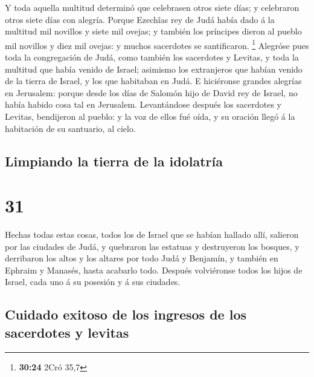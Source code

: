  Y toda aquella multitud determinó que celebrasen otros
siete días; y celebraron otros siete días con alegría. 
Porque Ezechîas rey de Judá había dado á la multitud mil novillos y
siete mil ovejas; y también los príncipes dieron al pueblo mil novillos
y diez mil ovejas: y muchos sacerdotes se santificaron. \footnote{\textbf{30:24}
  2Cró 35,7}  Alegróse pues toda la congregación de Judá,
como también los sacerdotes y Levitas, y toda la multitud que había
venido de Israel; asimismo los extranjeros que habían venido de la
tierra de Israel, y los que habitaban en Judá.  E
hiciéronse grandes alegrías en Jerusalem: porque desde los días de
Salomón hijo de David rey de Israel, no había habido cosa tal en
Jerusalem.  Levantándose después los sacerdotes y
Levitas, bendijeron al pueblo: y la voz de ellos fué oída, y su oración
llegó á la habitación de su santuario, al cielo.

\hypertarget{limpiando-la-tierra-de-la-idolatruxeda}{%
\subsection{Limpiando la tierra de la
idolatría}\label{limpiando-la-tierra-de-la-idolatruxeda}}

\hypertarget{section-30}{%
\section{31}\label{section-30}}

 Hechas todas estas cosas, todos los de Israel que se
habían hallado allí, salieron por las ciudades de Judá, y quebraron las
estatuas y destruyeron los bosques, y derribaron los altos y los altares
por todo Judá y Benjamín, y también en Ephraim y Manasés, hasta acabarlo
todo. Después volviéronse todos los hijos de Israel, cada uno á su
posesión y á sus ciudades.

\hypertarget{cuidado-exitoso-de-los-ingresos-de-los-sacerdotes-y-levitas}{%
\subsection{Cuidado exitoso de los ingresos de los sacerdotes y
levitas}\label{cuidado-exitoso-de-los-ingresos-de-los-sacerdotes-y-levitas}}

